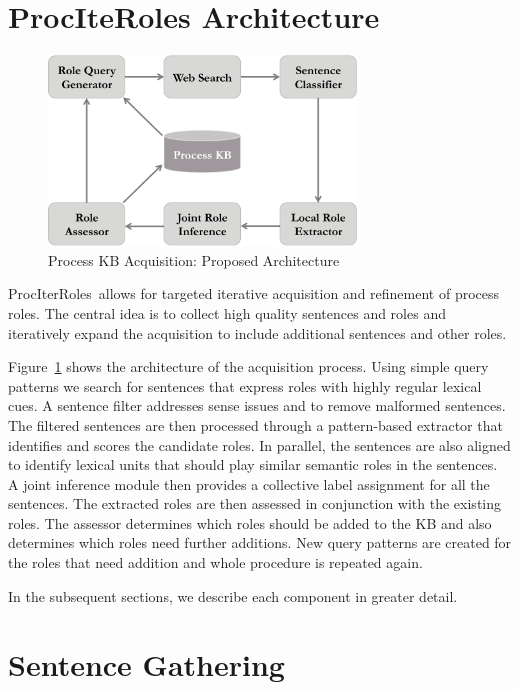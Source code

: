
\newcommand{\sys}{ProcIterRoles}

\section{ProcIteRoles Architecture}
\begin{figure}[hbt]
	\begin{center}
	\includegraphics[width=3.22in,height=1.99in]{figures/architecture.pdf} 	
	\caption{\label{fig:architecture} {Process KB Acquisition: Proposed Architecture}}
	\end{center}
\end{figure}
\sys\ allows for targeted iterative acquisition and refinement of process roles.
The central idea is to collect high quality sentences and roles and iteratively expand the acquisition to include
additional sentences and other roles. 

Figure~\ref{fig:architecture} shows the architecture of the acquisition process. 
Using simple query patterns we search for sentences that express roles with highly regular lexical cues. 
A sentence filter addresses sense issues and to remove malformed sentences.
The filtered sentences are then processed through a pattern-based extractor that identifies and scores the candidate roles. 
In parallel, the sentences are also aligned to identify lexical units that should play similar semantic roles in the sentences. 
A joint inference module then provides a collective label assignment for all the sentences. 
The extracted roles are then assessed in conjunction with the existing roles. 
The assessor determines which roles should be added to the KB and also determines which roles need further additions. 
New query patterns are created for the roles that need addition and whole procedure is repeated again. 

In the subsequent sections, we describe each component in greater detail.

\section{Sentence Gathering}

